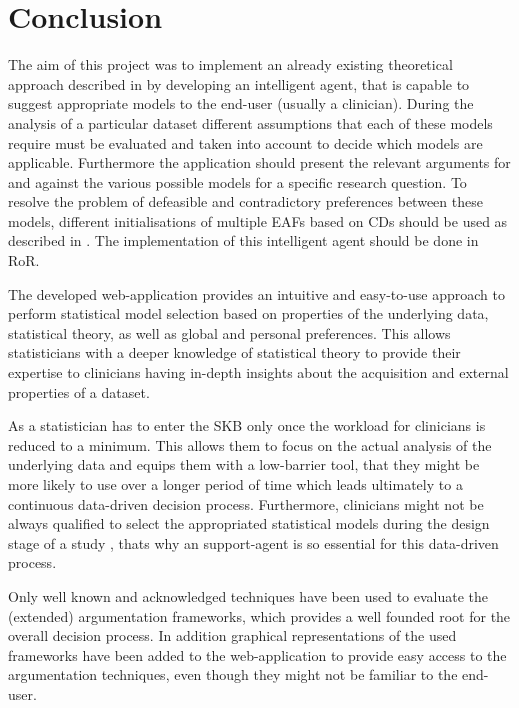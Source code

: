 \section{Conclusion}
\label{sec:conclusion}
The aim of this project was to implement an already existing theoretical approach described in \cite{sassoon2014} by developing an intelligent agent, that is capable to suggest appropriate models to the end-user (usually a clinician). During the analysis of a particular dataset different assumptions that each of these models require must be evaluated and taken into account to decide which models are applicable. Furthermore the application should present the relevant arguments for and against the various possible models  for a specific research question. To resolve the problem of defeasible and contradictory preferences between these models, different initialisations of multiple \glspl{EAF} based on \glspl{CD} should be used as described in \cite{sassoon2016, sassoon2016CD}. The implementation of this intelligent agent should be done in \gls{RoR}.

The developed web-application provides an intuitive and easy-to-use approach to perform statistical model selection based on properties of the underlying data, statistical theory, as well as global and personal preferences. This allows statisticians with a deeper knowledge of statistical theory to provide their expertise to clinicians having in-depth insights about the acquisition and external properties of a dataset. 

As a statistician has to enter the \gls{SKB} only once the workload for clinicians is reduced to a minimum. This allows them to focus on the actual analysis of the underlying data and equips them with a low-barrier tool, that they might be more likely to use over a longer period of time which leads ultimately to a continuous data-driven decision process. Furthermore, clinicians might not be always qualified to select the appropriated statistical models during the design stage of a study \cite{sassoon2014}, thats why an support-agent is so essential for this data-driven process.

Only well known and acknowledged techniques have been used to evaluate the (extended) argumentation frameworks, which provides a well founded root for the overall decision process. In addition graphical representations of the used frameworks have been added to the web-application to provide easy access to the argumentation techniques, even though they might not be familiar to the end-user.

